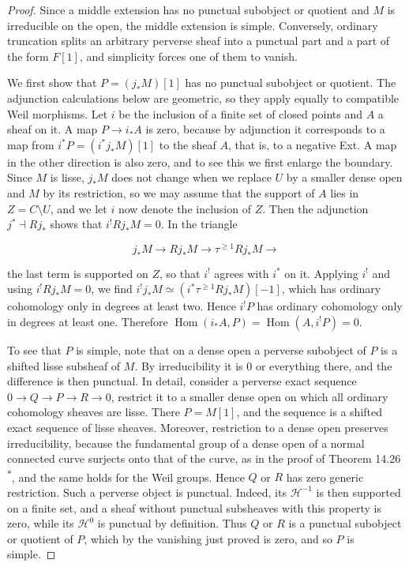 \documentclass[11pt]{article}
\newcommand{\bpout}[1]{#1\textsuperscript{\hyperlink{bp-outside}{\ensuremath{\ast}}}}
\providecommand{\Hom}{}\renewcommand{\Hom}{\operatorname{Hom}}
\begin{document}
\begin{proof}[{Proof}]\label{bp44}%
Since a middle extension has no punctual subobject or quotient and \(M\) is irreducible on the open, the middle extension is simple. Conversely, ordinary truncation splits an arbitrary perverse sheaf into a punctual part and a part of the form \(F[1]\), and simplicity forces one of them to vanish.

We first show that \(P=(j_*M)[1]\) has no punctual subobject or quotient. The adjunction calculations below are geometric, so they apply equally to compatible Weil morphisms. Let \(i\) be the inclusion of a finite set of closed points and \(A\) a sheaf on it. A map \(P\to i_*A\) is zero, because by adjunction it corresponds to a map from \(i^*P=(i^*j_*M)[1]\) to the sheaf \(A\), that is, to a negative Ext. A map in the other direction is also zero, and to see this we first enlarge the boundary. Since \(M\) is lisse, \(j_*M\) does not change when we replace \(U\) by a smaller dense open and \(M\) by its restriction, so we may assume that the support of \(A\) lies in \(Z=C\setminus U\), and we let \(i\) now denote the inclusion of \(Z\). Then the adjunction \(j^*\dashv Rj_*\) shows that \(i^!Rj_*M=0\). In the triangle

\[
j_*M\longrightarrow Rj_*M\longrightarrow
\tau^{\ge1}Rj_*M\longrightarrow
\]

the last term is supported on \(Z\), so that \(i^!\) agrees with \(i^*\) on it. Applying \(i^!\) and using \(i^!Rj_*M=0\), we find \(i^!j_*M\simeq(i^*\tau^{\ge1}Rj_*M)[-1]\), which has ordinary cohomology only in degrees at least two. Hence \(i^!P\) has ordinary cohomology only in degrees at least one. Therefore \(\Hom(i_*A,P)=\Hom(A,i^!P)=0\).

To see that \(P\) is simple, note that on a dense open a perverse subobject of \(P\) is a shifted lisse subsheaf of \(M\). By irreducibility it is \(0\) or everything there, and the difference is then punctual. In detail, consider a perverse exact sequence \(0\to Q\to P\to R\to0\), restrict it to a smaller dense open on which all ordinary cohomology sheaves are lisse. There \(P=M[1]\), and the sequence is a shifted exact sequence of lisse sheaves. Moreover, restriction to a dense open preserves irreducibility, because the fundamental group of a dense open of a normal connected curve surjects onto that of the curve, as in the proof of Theorem \bpout{14.26}, and the same holds for the Weil groups. Hence \(Q\) or \(R\) has zero generic restriction. Such a perverse object is punctual. Indeed, its \(\mathcal H^{-1}\) is then supported on a finite set, and a sheaf without punctual subsheaves with this property is zero, while its \(\mathcal H^0\) is punctual by definition. Thus \(Q\) or \(R\) is a punctual subobject or quotient of \(P\), which by the vanishing just proved is zero, and so \(P\) is simple.


\end{proof}
\end{document}
